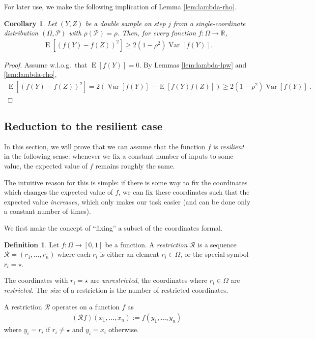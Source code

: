 \documentclass{daj}
\newcommand{\1}{\mathbbm{1}}
\theoremstyle{plain}
\newtheorem{corollary}[theorem]{Corollary}
\theoremstyle{definition}
\newtheorem{definition}[theorem]{Definition}
\DeclareMathOperator*{\EE}{E}
\DeclareMathOperator*{\Var}{Var}
\newcommand{\cP}{\mathcal{P}}
\newcommand{\cR}{\mathcal{R}}
\begin{document}
For later use, we make the following implication of Lemma \ref{lem:lambda-rho}.
\begin{corollary}\label{cor:varianceToEdgeVar}
Let $(Y, Z)$ be a double sample on step $j$ from a single-coordinate
distribution $(\Omega, \mathcal{P})$ with $\rho(\cP) = \rho$.
Then, for every function $f: \Omega \to \mathbb{R}$,
\begin{align}
\EE[(f(Y)-f(Z))^2] \geq 2(1-\rho^2) \Var[f(Y)].
\end{align}
\end{corollary}
\begin{proof}
Assume w.l.o.g.~that $\EE[f(Y)]=0$.
By Lemmas \ref{lem:lambda-lpw} and \ref{lem:lambda-rho},
\begin{align*}
\EE\left[ \left( f(Y)-f(Z) \right)^2 \right]
= 2\left( \Var[f(Y)] - \EE[f(Y)f(Z)] \right)
\ge 2(1-\rho^2)\Var[f(Y)] \; .
\end{align*}
\end{proof}

\subsection{Reduction to the resilient case}
In this section, we will prove that we can assume that 
the function $f$ is \emph{resilient} in the following sense:
whenever we fix a constant number of inputs to some 
value, the expected value of $f$ remains roughly the same.

The intuitive reason for this is simple: if there is some way to fix
the coordinates which changes the expected value of $f$, we
can fix these coordinates such that the expected value \emph{increases}, 
which only makes our task easier
(and can be done only a constant number of times).

\medskip

We first make the concept of ``fixing'' a subset of the coordinates formal.

\begin{definition}
Let $f: \underline{\Omega} \to [0,1]$ be a function.
A \emph{restriction} $\cR$ is a sequence $\cR = (r_1,\ldots,r_n)$
where each $r_i$ is either an element $r_i \in \Omega$,
or the special symbol $r_i = \star$.

The coordinates with $r_i = \star$ are \emph{unrestricted}, the coordinates
where $r_i \in \Omega$ are \emph{restricted}.
The \emph{size} of a restriction is the number of restricted coordinates.

A restriction $\cR$ operates on a function $f$ as
\begin{align}
(\cR f) (x_1,\ldots,x_n) := f(y_1,\ldots,y_n) \; 
\end{align}
where $y_i = r_i$ if $r_i \neq \star$ and $y_i = x_i$ otherwise.
\end{definition}
\end{document}
